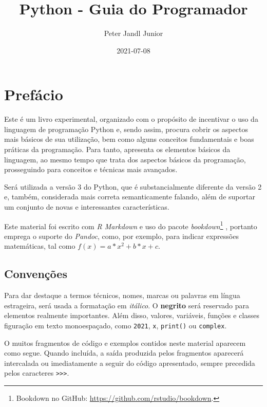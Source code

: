 \documentclass[
]{book}
\title{Python - Guia do Programador}
\author{Peter Jandl Junior}
\date{2021-07-08}
\begin{document}
\maketitle

{
\setcounter{tocdepth}{1}
\tableofcontents
}
\hypertarget{prefuxe1cio}{%
\chapter*{Prefácio}\label{prefuxe1cio}}

Este é um livro experimental, organizado com o propósito de incentivar o uso da linguagem de programação Python e, sendo assim, procura cobrir os aspectos mais básicos de sua utilização, bem como alguns conceitos fundamentais e boas práticas da programação. Para tanto, apresenta os elementos básicos da linguagem, ao mesmo tempo que trata dos aspectos básicos da programação, prosseguindo para conceitos e técnicas mais avançados.

Será utilizada a versão 3 do Python, que é substancialmente diferente da versão 2 e, também, considerada mais correta semanticamente falando, além de suportar um conjunto de novas e interessantes características.

Este material foi escrito com \emph{R Markdown} e uso do pacote \emph{bookdown}\footnote{Bookdown no GitHub: \url{https://github.com/rstudio/bookdown}.} \citep{R-bookdown, xie2015}, portanto emprega o suporte do \emph{Pandoc}, como, por exemplo, para indicar expressões matemáticas, tal como \(f(x) = a*x^2 + b*x + c\).

\hypertarget{convenuxe7uxf5es}{%
\section*{Convenções}\label{convenuxe7uxf5es}}

Para dar destaque a termos técnicos, nomes, marcas ou palavras em língua estrageira, será usada a formatação em \emph{itálico}. O \textbf{negrito} será reservado para elementos realmente importantes. Além disso, valores, variáveis, funções e classes figuração em texto monoespaçado, como \texttt{2021}, \texttt{x}, \texttt{print()} ou \texttt{complex}.

O muitos fragmentos de código e exemplos contidos neste material aparecem como segue. Quando incluída, a saída produzida pelos fragmentos aparecerá intercalada ou imediatamente a seguir do código apresentado, sempre precedida pelos caracteres \texttt{\textgreater{}\textgreater{}\textgreater{}}.
\end{document}

